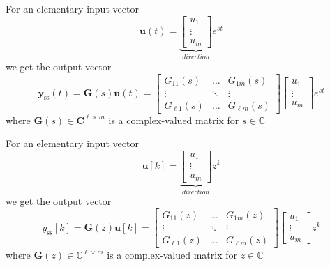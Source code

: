 
For an elementary input vector
\begin{equation*}
    \mathbf{u}(t)=\underbrace{\begin{bmatrix}u_{1}  \\
            \vdots \\
            u_{m}
        \end{bmatrix}}_{direction} e^{st}
\end{equation*}
we get the output vector
\begin{equation*}
    \mathbf{y}_{{\mathrm{ss}}}(t)=\mathbf{G}(s)\mathbf{u}(t)=
    \begin{bmatrix}G_{11}(s)    & \ldots & G_{1m}(s)     \\
               \vdots       & \ddots & \vdots        \\
               G_{\ell1}(s) & \ldots & G_{\ell m}(s)
    \end{bmatrix}
    \begin{bmatrix}u_{1}  \\
        \vdots \\
        u_{m}
    \end{bmatrix}e^{st}
\end{equation*}
where $\mathbf{G}(s)\in\mathbb{\mathbf{C}}^{\ell\times m}$ is a complex-valued matrix for $s\in \mathbb{C}$


For an elementary input vector
\begin{equation*}
    \mathbf{u}[k]=\underbrace{\begin{bmatrix}u_{1}  \\
            \vdots \\
            u_{m}
        \end{bmatrix}}_{direction} z^k
\end{equation*}
we get the output vector
\begin{equation*}
    y_{{\mathrm{ss}}}[k]=\mathbf{G}(z)\mathbf{u}[k]=
    \begin{bmatrix}G_{11}(z)    & \ldots & G_{1m}(z)     \\
               \vdots       & \ddots & \vdots        \\
               G_{\ell1}(z) & \ldots & G_{\ell m}(z)
    \end{bmatrix}
    \begin{bmatrix}u_{1}  \\
        \vdots \\
        u_{m}
    \end{bmatrix}z^k
\end{equation*}
where $\mathbf{G}(z)\in\mathbb{C}^{\ell\times m}$ is a complex-valued matrix for $z\in \mathbb{C}$

